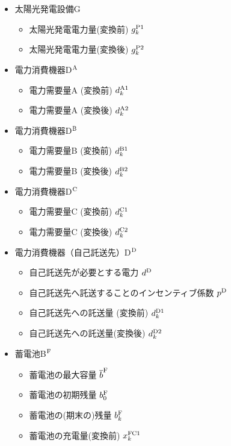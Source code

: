 \begin{itemize}
 	\item[\IS] 太陽光発電設備G
		\begin{itemize}
		 	\item[\IB] 太陽光発電電力量(変換前) $g^{\rm P1}_{k}$
  			\item[\IC] 太陽光発電電力量(変換後) $g^{\rm P2}_{k}$
		\end{itemize}	
	 \item[\IS] 電力消費機器D$^{\rm A}$
	 	\begin{itemize}
		 	\item[\IC] 電力需要量A (変換前) $d^{\rm A1}_{k}$
 			\item[\IB] 電力需要量A (変換後) $d^{\rm A2}_{k}$
		\end{itemize}
 	\item[\IS] 電力消費機器D$^{\rm B}$
	 	\begin{itemize}
		 	\item[\IC] 電力需要量B (変換前) $d^{\rm B1}_{k}$
 			\item[\IB] 電力需要量B (変換後) $d^{\rm B2}_{k}$
		\end{itemize}	
 	\item[\IS] 電力消費機器D$^{\rm C}$
	 	\begin{itemize}
		 	\item[\IC] 電力需要量C (変換前) $d^{\rm C1}_{k}$
 			\item[\IB] 電力需要量C (変換後) $d^{\rm C2}_{k}$
		\end{itemize}
 	\item[\IS] 電力消費機器（自己託送先）D$^{\rm D}$
 	\begin{itemize}
   		\item[\IB] 自己託送先が必要とする電力 $d^{\rm D}$
   		\item[\IB] 自己託送先へ託送することのインセンティブ係数 $p^{\rm D}$   
		\item[\IC] 自己託送先への託送量 (変換前) $d^{\rm D1}_{k}$
 		\item[\IC] 自己託送先への託送量(変換後) $d^{\rm D2}_{k}$
  	\end{itemize} 
 	\item[\IS] 蓄電池B$^{\rm F}$
  		\begin{itemize}
   			\item[\IB] 蓄電池の最大容量 $\overline{b}^{\rm F}$
			\item[\IB] 蓄電池の初期残量 $b^{\rm F}_{0}$
		  	\item[\IC] 蓄電池の(期末の)残量 $b^{\rm F}_{k}$
  			\item[\IC] 蓄電池の充電量(変換前) $x^{\rm FC1}_{k}$

\end{itemize}
\end{itemize}
